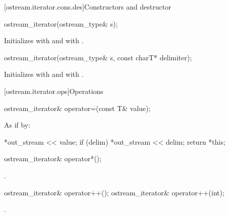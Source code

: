 [ostream.iterator.cons.des]{Constructors and destructor}

%
\begin{itemdecl}
ostream_iterator(ostream_type& s);
\end{itemdecl}

\begin{itemdescr}
\pnum
\effects
Initializes  with  and
 with .
\end{itemdescr}


%
\begin{itemdecl}
ostream_iterator(ostream_type& s, const charT* delimiter);
\end{itemdecl}

\begin{itemdescr}
\pnum
\effects
Initializes  with  and
 with .
\end{itemdescr}

[ostream.iterator.ops]{Operations}

%
\begin{itemdecl}
ostream_iterator& operator=(const T& value);
\end{itemdecl}

\begin{itemdescr}
\pnum
\effects
As if by:
\begin{codeblock}
*out_stream << value;
if (delim)
  *out_stream << delim;
return *this;
\end{codeblock}
\end{itemdescr}

%
\begin{itemdecl}
ostream_iterator& operator*();
\end{itemdecl}

\begin{itemdescr}
\pnum
\returns
{}.
\end{itemdescr}

%
\begin{itemdecl}
ostream_iterator& operator++();
ostream_iterator& operator++(int);
\end{itemdecl}

\begin{itemdescr}
\pnum
\returns
{}.
\end{itemdescr}

